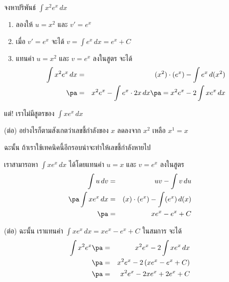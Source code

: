 \begin{frame}[t]
\begin{ex}
จงหาปริพันธ์ $\int x^2 e^x \, dx$
\end{ex}
\begin{sol}
\begin{enumerate}
\item ลองให้ $u = x^2$ และ $v' = e^x$ \pa
\item เมื่อ $v' = e^x$ \pa จะได้ $v = \int e^x \, dx = e^x + C$ \pa
\item แทนค่า $u = x^2$ และ $v = e^x$ ลงในสูตร จะได้\pa
\begin{eqnarray*}
\int x^2 e^x \, dx &=& (x^2) \cdot (e^x) - \int e^x \, d (x^2)\\ \pa
&=& x^2 e^x - \int e^x \cdot 2x \, dx  \pa = x^2 e^x - 2 \int xe^x \, dx
\end{eqnarray*}
\end{enumerate}
แต่! เราไม่มีสูตรของ $\int xe^x \, dx$\pa 
\end{sol}
\end{frame}

\begin{frame}
\begin{sol} (ต่อ)
อย่างไรก็ตามสังเกตว่าเลขชี้กำลังของ $x$ ลดลงจาก $x^2$ เหลือ $x^1 = x$\pa  

ฉะนั้น ถ้าเราใช้เทคนิคนี้อีกรอบน่าจะทำให้เลขชี้กำลังหายไป \pa

เราสามารถหา $\int xe^x \, dx$ ได้โดยแทนค่า $u = x$ และ $v = e^x$ ลงในสูตร \pa
\begin{eqnarray*}
\int u \, dv &=& uv - \int v\, du \\ \pa
\int x e^x \, dx &=& (x) \cdot (e^x) - \int (e^x) \, d (x) \\ \pa
&=& xe^x - e^x + C
\end{eqnarray*}
\end{sol}
\end{frame}

\begin{frame}
\begin{sol} (ต่อ)
ฉะนั้น เราแทนค่า $\int x e^x \, dx = xe^x - e^x + C$ ในสมการ จะได้
\begin{eqnarray*} 
\int x^2 e^x \pa &=& x^2 e^x - 2 \int xe^x \, dx \\ \pa
&=& x^2 e^x - 2 \left( xe^x - e^x + C \right) \\ \pa
&=& x^2 e^x - 2xe^x + 2e^x + C
\end{eqnarray*}
\end{sol}
\end{frame}


